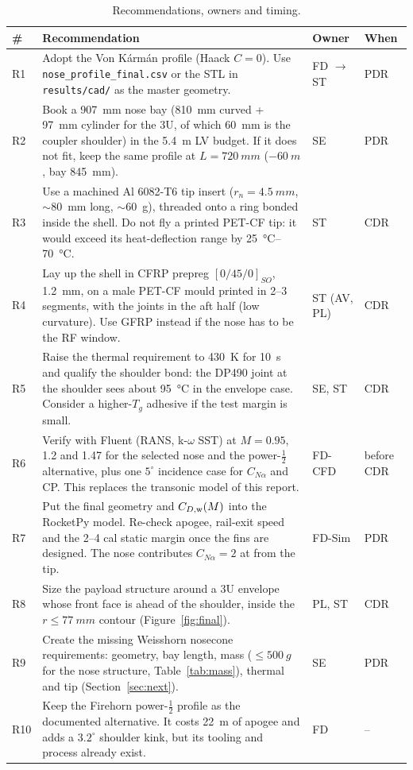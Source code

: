 \begin{table}[H]
\centering
\caption{Recommendations, owners and timing.}
\label{tab:reco}
\small
\begin{tabular}{@{}>{\raggedright\arraybackslash}p{0.8cm}>{\raggedright\arraybackslash}p{10.6cm}>{\raggedright\arraybackslash}p{2.2cm}>{\raggedright\arraybackslash}p{1.6cm}@{}}
\toprule
\# & Recommendation & Owner & When \\
\midrule
R1 & Adopt the Von K\'arm\'an profile (Haack $C=0$). Use \texttt{nose\_profile\_final.csv} or the STL
in \texttt{results/cad/} as the master geometry. & FD $\rightarrow$ ST & PDR \\
R2 & Book a \SI{907}{mm} nose bay (\SI{810}{mm} curved + \SI{97}{mm} cylinder for the 3U, of which
\SI{60}{mm} is the coupler shoulder) in the \SI{5.4}{m} LV budget. If it does not fit, keep the same
profile at $L = \SI{720}{mm}$ ($-\SI{60}{m}$, bay \SI{845}{mm}). & SE & PDR \\
R3 & Use a machined Al 6082-T6 tip insert ($r_n = \SI{4.5}{mm}$, $\sim$\SI{80}{mm} long,
$\sim$\SI{60}{g}), threaded onto a ring bonded inside the shell. Do not fly a printed PET-CF tip:
it would exceed its heat-deflection range by \SIrange{25}{70}{\celsius}. & ST & CDR \\
R4 & Lay up the shell in CFRP prepreg $[0/45/0]_{SO}$, \SI{1.2}{mm}, on a male PET-CF mould printed
in 2--3 segments, with the joints in the aft half (low curvature). Use GFRP instead if the nose
has to be the RF window. & ST (AV, PL) & CDR \\
R5 & Raise the thermal requirement to \SI{430}{K} for \SI{10}{s} and qualify the shoulder bond: the
DP490 joint at the shoulder sees about \SI{95}{\celsius} in the envelope case. Consider a higher-$T_g$ adhesive if
the test margin is small. & SE, ST & CDR \\
R6 & Verify with Fluent (RANS, k-$\omega$ SST) at $M = 0.95$, 1.2 and 1.47 for the selected nose and
the power-$\tfrac12$ alternative, plus one $5^\circ$ incidence case for $C_{N\alpha}$ and CP. This
replaces the transonic model of this report. & FD-CFD & before CDR \\
R7 & Put the final geometry and $C_{D,\rm w}(M)$ into the RocketPy model. Re-check apogee, rail-exit
speed and the 2--4 cal static margin once the fins are designed. The nose contributes
$C_{N\alpha} = 2$ at \FINXCP{} from the tip. & FD-Sim & PDR \\
R8 & Size the payload structure around a 3U envelope whose front face is \FINTHREEU{} ahead of the
shoulder, inside the $r \leq \SI{77}{mm}$ contour (Figure~\ref{fig:final}). & PL, ST & CDR \\
R9 & Create the missing Weisshorn nosecone requirements: geometry, bay length, mass
($\leq\SI{500}{g}$ for the nose structure, Table~\ref{tab:mass}), thermal and tip
(Section~\ref{sec:next}). & SE & PDR \\
R10 & Keep the Firehorn power-$\tfrac12$ profile as the documented alternative. It costs
\SI{22}{m} of apogee and adds a $3.2^\circ$ shoulder kink, but its tooling and process already exist. & FD & -- \\
\bottomrule
\end{tabular}
\end{table}

